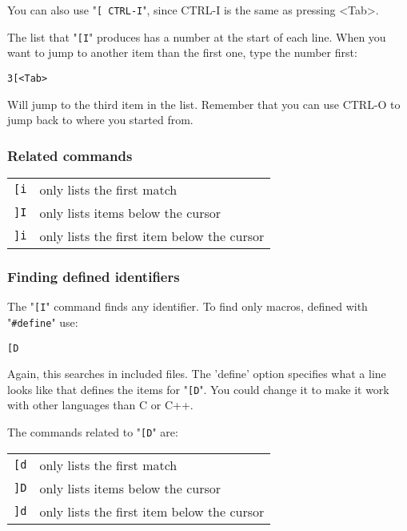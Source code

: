You can also use "\verb![ CTRL-I!", since CTRL-I is the same as pressing <Tab>.

The list that "\verb![I!" produces has a number at the start of each line.
When you want to jump to another item than the first one, type the number first:

\begin{Verbatim}[samepage=true]
 3[<Tab>
\end{Verbatim}

Will jump to the third item in the list.
Remember that you can use CTRL-O to jump back to where you started from.
\subsubsection{Related commands}

\begin{center} \begin{tabular}{c l}
\verb![i! & only lists the first match \\
\verb!]I! & only lists items below the cursor \\
\verb!]i! & only lists the first item below the cursor \\
\end{tabular} \end{center}

\subsubsection{Finding defined identifiers}
The "\verb![I!" command finds any identifier.
To find only macros, defined with "\verb!#define!" use:

\begin{Verbatim}[samepage=true]
 [D
\end{Verbatim}

Again, this searches in included files.
The 'define' option specifies what a line looks like that defines the items for "\verb![D!".
You could change it to make it work with other languages than C or C++.

The commands related to "\verb![D!" are:

\begin{center} \begin{tabular}{c l}
\verb![d! & only lists the first match \\
\verb!]D! & only lists items below the cursor \\
\verb!]d! & only lists the first item below the cursor \\
\end{tabular} \end{center}
